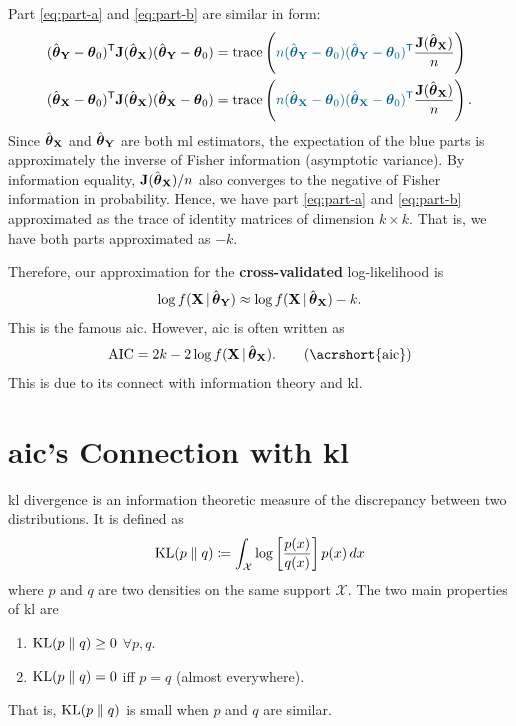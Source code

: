 \documentclass[a4paper]{article}
\begin{document}
Part \eqref{eq:part-a} and \eqref{eq:part-b} are similar in form:
\begin{align*}
	(\hat\ttheta_{\YY}-\ttheta_{0})\T
	\JJ(\hat\ttheta_{\XX})
	(\hat\ttheta_{\YY}-\ttheta_{0})
	&=
	\trace
	\left(
	\blue{
	n
	(\hat\ttheta_{\YY}-\ttheta_{0})
	(\hat\ttheta_{\YY}-\ttheta_{0})\T
	}
	\frac{\JJ(\hat\ttheta_{\XX})}{n}
	\right) \\
	(\hat\ttheta_{\XX}-\ttheta_{0})\T
	\JJ(\hat\ttheta_{\XX})
	(\hat\ttheta_{\XX}-\ttheta_{0})
	&=
	\trace
	\left(
	\blue{
	n
	(\hat\ttheta_{\XX}-\ttheta_{0})
	(\hat\ttheta_{\XX}-\ttheta_{0})\T
	}
	\frac{\JJ(\hat\ttheta_{\XX})}{n}
	\right).
\end{align*}
Since $\hat{\boldsymbol{\theta}}_{\mathbf{X}}$ and $\hat{\boldsymbol{\theta}}_{\mathbf{Y}}$ are both \acrshort{ml} estimators,
the expectation of the blue parts is approximately the inverse of Fisher information (asymptotic variance).
By information equality,
$\mathbf{J}(\hat{\boldsymbol{\theta}}_{\mathbf{X}})/n$ also converges to the negative of Fisher information in probability.
Hence, we have part \eqref{eq:part-a} and \eqref{eq:part-b} approximated as the trace of identity matrices of dimension $k\times k$.
That is, we have both parts approximated as $-k$.

Therefore, our approximation for the \textbf{cross-validated} log-likelihood is
\begin{align*}
	\log f(\mathbf{X}\,|\,\hat{\boldsymbol{\theta}}_{\mathbf{Y}})
	\approx
	\log f(\mathbf{X}\,|\,\hat{\boldsymbol{\theta}}_{\mathbf{X}}) - k.
\end{align*}
This is the famous \acrshort{aic}.
However, \acrshort{aic} is often written as
\begin{align*}
	\aic = 2k - 2 \log f(\XX\given\hat\ttheta_{\XX}). \label{eq:aic}\tag{\acrshort{aic}}
\end{align*}
This is due to its connect with information theory and \acrlong{kl}.

\section{\texorpdfstring{\acrshort{aic}}{AIC}'s Connection with \texorpdfstring{\acrlong{kl}}{KL Divergence}}

\acrshort{kl} divergence is an information theoretic measure of the discrepancy between two distributions.
It is defined as
\begin{align*}
	\operatorname{KL}(p\;\|\; q) \coloneqq \int_{\mathcal{X}} \log\left[\frac{p(x)}{q(x)}\right]p(x)\,d{x}
\end{align*}
where $p$ and $q$ are two densities on the same support $\mathcal{X}$.
The two main properties of \acrshort{kl} are
\begin{enumerate}
	\item $\operatorname{KL}(p\;\|\; q)\geq 0$ $\forall p,q$.
	\item $\operatorname{KL}(p\;\|\; q)=0$ iff $p=q$ (almost everywhere).
\end{enumerate}
That is, $\operatorname{KL}(p\;\|\; q)$ is small when $p$ and $q$ are similar.
\end{document}
